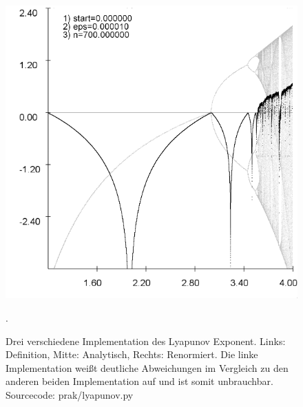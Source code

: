 \documentclass{scrartcl}
\begin{document}
\begin{figure}
\includegraphics[scale=0.28]{iteration/lyapunov-3}
\caption{Drei verschiedene Implementation des Lyapunov Exponent. Links: Definition, Mitte: Analytisch, Rechts: Renormiert. Die linke Implementation weißt deutliche Abweichungen im Vergleich zu den anderen beiden Implementation auf und ist somit unbrauchbar. Sourcecode: prak/lyapunov.py}. 
\end{figure}
\end{document}
